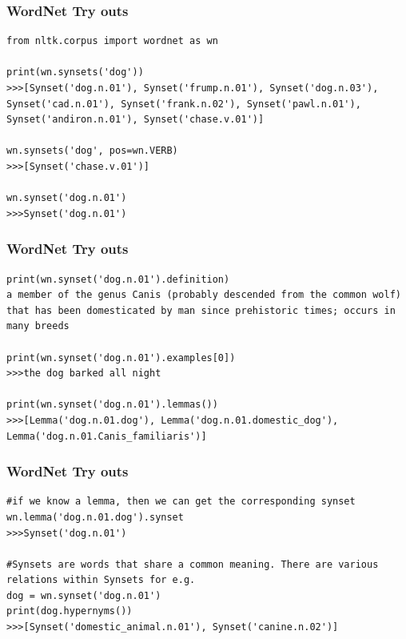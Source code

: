 \begin{frame}[fragile]
\frametitle{ WordNet Try outs}
\begin{lstlisting}
from nltk.corpus import wordnet as wn

print(wn.synsets('dog'))
>>>[Synset('dog.n.01'), Synset('frump.n.01'), Synset('dog.n.03'), Synset('cad.n.01'), Synset('frank.n.02'), Synset('pawl.n.01'), Synset('andiron.n.01'), Synset('chase.v.01')]

wn.synsets('dog', pos=wn.VERB)
>>>[Synset('chase.v.01')]

wn.synset('dog.n.01')
>>>Synset('dog.n.01')
\end{lstlisting}
\end{frame}

\begin{frame}[fragile]
\frametitle{ WordNet Try outs}
\begin{lstlisting}
print(wn.synset('dog.n.01').definition)
a member of the genus Canis (probably descended from the common wolf) that has been domesticated by man since prehistoric times; occurs in many breeds

print(wn.synset('dog.n.01').examples[0])
>>>the dog barked all night

print(wn.synset('dog.n.01').lemmas())
>>>[Lemma('dog.n.01.dog'), Lemma('dog.n.01.domestic_dog'), Lemma('dog.n.01.Canis_familiaris')]
\end{lstlisting}
\end{frame}

\begin{frame}[fragile]
\frametitle{ WordNet Try outs}
\begin{lstlisting}
#if we know a lemma, then we can get the corresponding synset
wn.lemma('dog.n.01.dog').synset
>>>Synset('dog.n.01')

#Synsets are words that share a common meaning. There are various relations within Synsets for e.g. 
dog = wn.synset('dog.n.01')
print(dog.hypernyms())
>>>[Synset('domestic_animal.n.01'), Synset('canine.n.02')]
\end{lstlisting}
\end{frame}

